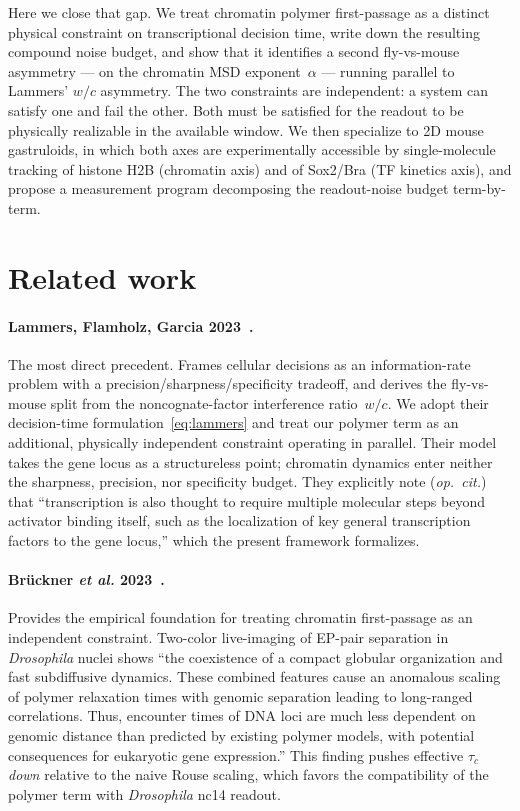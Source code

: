\documentclass[11pt]{article}
\begin{document}
Here we close that gap. We treat chromatin polymer first-passage as a
distinct physical constraint on transcriptional decision time, write down
the resulting compound noise budget, and show that it identifies a second
fly-vs-mouse asymmetry --- on the chromatin MSD exponent~$\alpha$ ---
running parallel to Lammers' $w/c$ asymmetry. The two constraints are
independent: a system can satisfy one and fail the other. Both must be
satisfied for the readout to be physically realizable in the available
window. We then specialize to 2D mouse gastruloids, in which both axes are
experimentally accessible by single-molecule tracking of histone H2B
(chromatin axis) and of Sox2/Bra (TF kinetics axis), and propose a
measurement program decomposing the readout-noise budget term-by-term.

\section{Related work}
\label{sec:related}

\paragraph{Lammers, Flamholz, Garcia 2023~\cite{Lammers2023}.}
The most direct precedent. Frames cellular decisions as an information-rate
problem with a precision/sharpness/specificity tradeoff, and derives the
fly-vs-mouse split from the noncognate-factor interference ratio~$w/c$. We
adopt their decision-time formulation~\eqref{eq:lammers} and treat our
polymer term as an additional, physically independent constraint operating
in parallel. Their model takes the gene locus as a structureless point;
chromatin dynamics enter neither the sharpness, precision, nor specificity
budget. They explicitly note (\textit{op.~cit.}) that ``transcription is
also thought to require multiple molecular steps beyond activator binding
itself, such as the localization of key general transcription factors to
the gene locus,'' which the present framework formalizes.

\paragraph{Br\"uckner \textit{et al.} 2023~\cite{Bruckner2023}.} Provides
the empirical foundation for treating chromatin first-passage as an
independent constraint. Two-color live-imaging of EP-pair separation in
\textit{Drosophila} nuclei shows ``the coexistence of a compact globular
organization and fast subdiffusive dynamics. These combined features cause
an anomalous scaling of polymer relaxation times with genomic separation
leading to long-ranged correlations. Thus, encounter times of DNA loci are
much less dependent on genomic distance than predicted by existing polymer
models, with potential consequences for eukaryotic gene expression.''
This finding pushes effective $\tau_c$ \emph{down} relative to the naive
Rouse scaling, which favors the compatibility of the polymer term with
\textit{Drosophila} nc14 readout.
\end{document}

